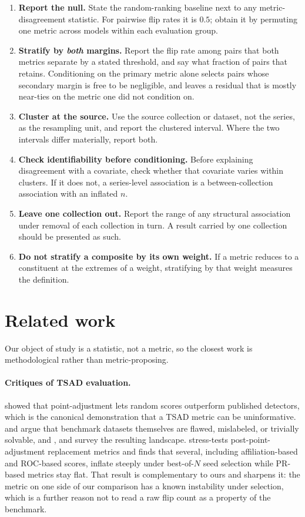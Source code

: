 \documentclass[twoside,11pt]{article}
\begin{document}
\begin{enumerate}
\item \textbf{Report the null.} State the random-ranking baseline next to any
  metric-disagreement statistic. For pairwise flip rates it is $0.5$; obtain it
  by permuting one metric across models within each evaluation group.
\item \textbf{Stratify by \emph{both} margins.} Report the flip rate among
  pairs that both metrics separate by a stated threshold, and say what fraction
  of pairs that retains. Conditioning on the primary metric alone selects pairs
  whose secondary margin is free to be negligible, and leaves a residual that is
  mostly near-ties on the metric one did not condition on.
\item \textbf{Cluster at the source.} Use the source collection or dataset, not
  the series, as the resampling unit, and report the clustered interval. Where
  the two intervals differ materially, report both.
\item \textbf{Check identifiability before conditioning.} Before explaining
  disagreement with a covariate, check whether that covariate varies within
  clusters. If it does not, a series-level association is a between-collection
  association with an inflated $n$.
\item \textbf{Leave one collection out.} Report the range of any structural
  association under removal of each collection in turn. A result carried by one
  collection should be presented as such.
\item \textbf{Do not stratify a composite by its own weight.} If a metric
  reduces to a constituent at the extremes of a weight, stratifying by that
  weight measures the definition.
\end{enumerate}

\section{Related work}

Our object of study is a statistic, not a metric, so the closest work is
methodological rather than metric-proposing.

\paragraph{Critiques of TSAD evaluation.} \citet{kim2022towards} showed that
point-adjustment lets random scores outperform published detectors, which is the
canonical demonstration that a TSAD metric can be uninformative.
\citet{wu2023current} and \citet{liu2024elephant} argue that benchmark datasets
themselves are flawed, mislabeled, or trivially solvable, and
\citet{schmidl2022anomaly}, \citet{blazquez2021review} and
\citet{boniol2024dive} survey the resulting landscape. \citet{lyu2026didwe} stress-tests post-point-adjustment replacement
metrics and finds that several, including affiliation-based and ROC-based
scores, inflate steeply under best-of-$N$ seed selection while PR-based metrics
stay flat. That result is complementary to ours and sharpens it: the metric on
one side of our comparison has a known instability under selection, which is a
further reason not to read a raw flip count as a property of the benchmark.
\end{document}
